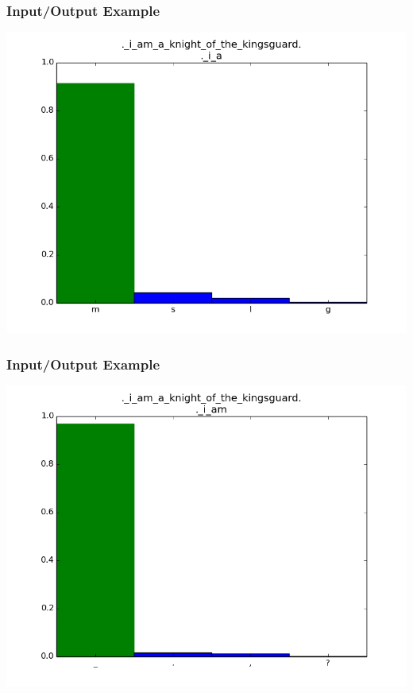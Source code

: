 \documentclass[12]{beamer}
\begin{document}
\begin{frame}
\frametitle{Input/Output Example}
\begin{center}
\includegraphics[scale=0.4]{../distplot/04.png}
\end{center}
\end{frame}

\begin{frame}
\frametitle{Input/Output Example}
\begin{center}
\includegraphics[scale=0.4]{../distplot/05.png}
\end{center}
\end{frame}
\end{document}
